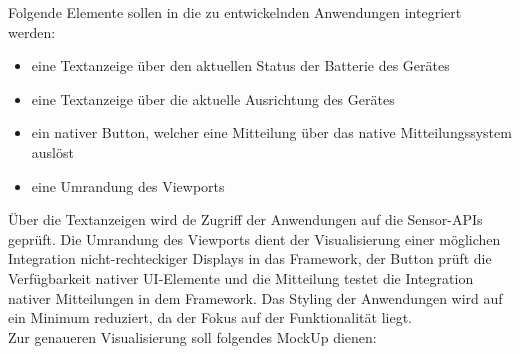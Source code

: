 \documentclass[a4paper]{scrartcl}
\begin{document}
Folgende Elemente sollen in die zu entwickelnden Anwendungen integriert werden:

\begin{itemize}
	\item eine Textanzeige über den aktuellen Status der Batterie des Gerätes
	\item eine Textanzeige über die aktuelle Ausrichtung des Gerätes
	\item ein nativer Button, welcher eine Mitteilung über das native Mitteilungssystem auslöst 
	\item eine Umrandung des Viewports
\end{itemize}

Über die Textanzeigen wird de Zugriff der Anwendungen auf die Sensor-APIs geprüft. Die Umrandung des Viewports dient der Visualisierung einer möglichen Integration nicht-rechteckiger Displays in das Framework, der Button prüft die Verfügbarkeit nativer UI-Elemente und die Mitteilung testet die Integration nativer Mitteilungen in dem Framework. Das Styling der Anwendungen wird auf ein Minimum reduziert, da der Fokus auf der Funktionalität liegt. \\
Zur genaueren Visualisierung soll folgendes MockUp dienen:
\end{document}
